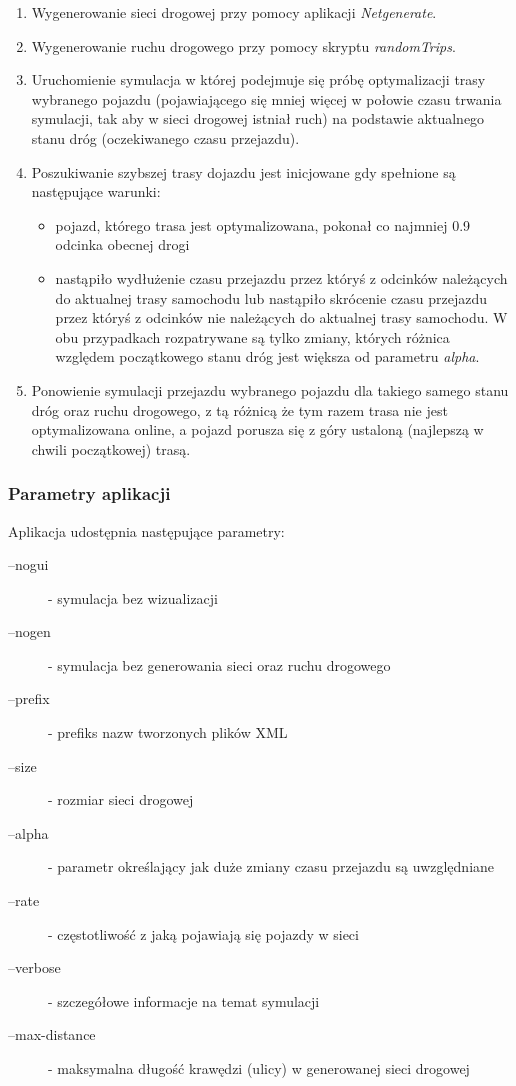 \documentclass[11pt,a4paper]{article}
\begin{document}
\begin{enumerate}
	\item Wygenerowanie sieci drogowej przy pomocy aplikacji \emph{Netgenerate}.
	\item Wygenerowanie ruchu drogowego przy pomocy skryptu \emph{randomTrips}.
	\item Uruchomienie symulacja w której podejmuje się próbę optymalizacji trasy wybranego pojazdu (pojawiającego się mniej więcej w połowie czasu trwania symulacji, tak aby w sieci drogowej istniał ruch) na podstawie aktualnego stanu dróg (oczekiwanego czasu przejazdu).
	\item Poszukiwanie szybszej trasy dojazdu jest inicjowane gdy spełnione są następujące warunki:
	\begin{itemize}
		\item pojazd, którego trasa jest optymalizowana, pokonał co najmniej 0.9 odcinka obecnej drogi
		\item nastąpiło wydłużenie czasu przejazdu przez któryś z odcinków należących do aktualnej trasy samochodu lub nastąpiło skrócenie czasu przejazdu przez któryś z odcinków nie należących do aktualnej trasy samochodu. W obu przypadkach rozpatrywane są tylko zmiany, których różnica względem początkowego stanu dróg jest większa od parametru \textit{alpha}.
	\end{itemize}
	\item Ponowienie symulacji przejazdu wybranego pojazdu dla takiego samego stanu dróg oraz ruchu drogowego, z tą różnicą że tym razem trasa nie jest optymalizowana online, a pojazd porusza się z góry ustaloną (najlepszą w chwili początkowej) trasą. 
\end{enumerate}

\subsubsection{Parametry aplikacji}

Aplikacja udostępnia następujące parametry:
\begin{description}
	\item[--nogui] - symulacja bez wizualizacji
	\item[--nogen] - symulacja bez generowania sieci oraz ruchu drogowego
	\item[--prefix] - prefiks nazw tworzonych plików XML
	\item[--size] - rozmiar sieci drogowej
	\item[--alpha] - parametr określający jak duże zmiany czasu przejazdu są uwzględniane
	\item[--rate] - częstotliwość z jaką pojawiają się pojazdy w sieci
	\item[--verbose] - szczegółowe informacje na temat symulacji
	\item[--max-distance] - maksymalna długość krawędzi (ulicy) w generowanej sieci drogowej
\end{description}
\end{document}
